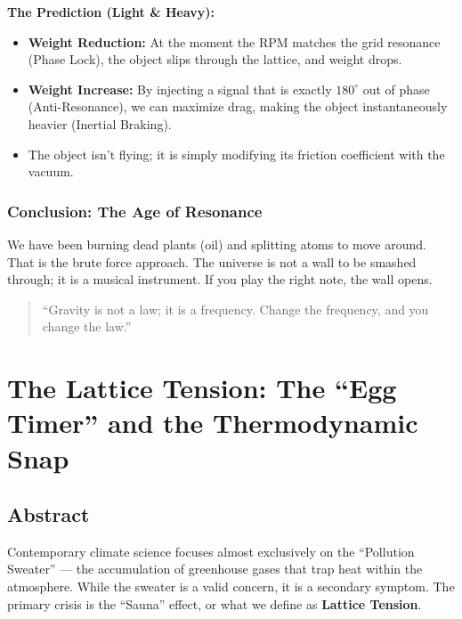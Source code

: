 \documentclass[11pt, letterpaper, openany]{book}
\begin{document}
\noindent\textbf{The Prediction (Light \& Heavy):}

\begin{itemize}
    \item \textbf{Weight Reduction:} At the moment the RPM matches the grid resonance (Phase
    Lock), the object slips through the lattice, and weight drops.
    \item \textbf{Weight Increase:} By injecting a signal that is exactly $180^\circ$ out of phase
    (Anti-Resonance), we can maximize drag, making the object instantaneously heavier
    (Inertial Braking).
    \item The object isn’t flying; it is simply modifying its friction coefficient with the vacuum.
\end{itemize}

\subsection*{Conclusion: The Age of Resonance}

We have been burning dead plants (oil) and splitting atoms to move around. That is the
brute force approach. The universe is not a wall to be smashed through; it is a musical
instrument. If you play the right note, the wall opens.

\begin{quote}
“Gravity is not a law; it is a frequency. Change the frequency, and you change the law.”
\end{quote}

\clearpage

\chapter{The Lattice Tension: The ``Egg Timer'' and the Thermodynamic Snap}

\section{Abstract}

Contemporary climate science focuses almost exclusively on the “Pollution Sweater” —
the accumulation of greenhouse gases that trap heat within the atmosphere. While the
sweater is a valid concern, it is a secondary symptom. The primary crisis is the “Sauna”
effect, or what we define as \textbf{Lattice Tension}.
\end{document}
